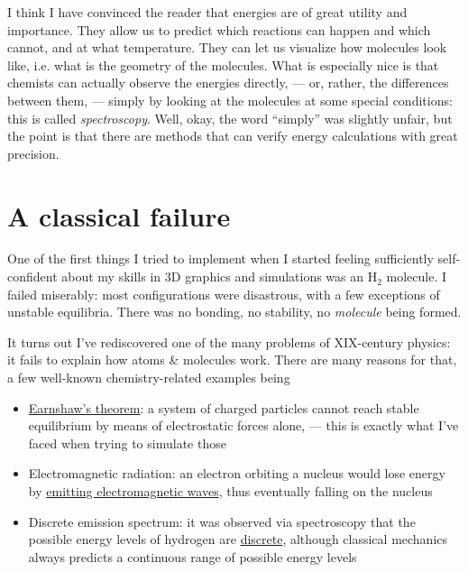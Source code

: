 \documentclass{article}
\newcommand{\molecule}[1]{\textrm{#1}}
\begin{document}
I think I have convinced the reader that energies are of great utility and importance. They allow us to predict which reactions can happen and which cannot, and at what temperature. They can let us visualize how molecules look like, i.e. what is the geometry of the molecules. What is especially nice is that chemists can actually observe the energies directly, --- or, rather, the differences between them, --- simply by looking at the molecules at some special conditions: this is called \textit{spectroscopy}. Well, okay, the word ``simply'' was slightly unfair, but the point is that there are methods that can verify energy calculations with great precision.

\newpage

\section{A classical failure}

One of the first things I tried to implement when I started feeling sufficiently self-confident about my skills in 3D graphics and simulations was an \(\molecule{H}_2\) molecule. I failed miserably: most configurations were disastrous, with a few exceptions of unstable equilibria. There was no bonding, no stability, no \textit{molecule} being formed.

It turns out I've rediscovered one of the many problems of XIX-century physics: it fails to explain how atoms \& molecules work. There are many reasons for that, a few well-known chemistry-related examples being

\begin{itemize}
\item \href{https://en.wikipedia.org/wiki/Earnshaw's_theorem}{Earnshaw's theorem}: a system of charged particles cannot reach stable equilibrium by means of electrostatic forces alone, --- this is exactly what I've faced when trying to simulate those
\item Electromagnetic radiation: an electron orbiting a nucleus would lose energy by \href{https://en.wikipedia.org/wiki/Larmor_formula}{emitting electromagnetic waves}, thus eventually falling on the nucleus
\item Discrete emission spectrum: it was observed via spectroscopy that the possible energy levels of hydrogen are \href{https://en.wikipedia.org/wiki/Hydrogen_spectral_series}{discrete}, although classical mechanics always predicts a continuous range of possible energy levels
\end{itemize}
\end{document}
